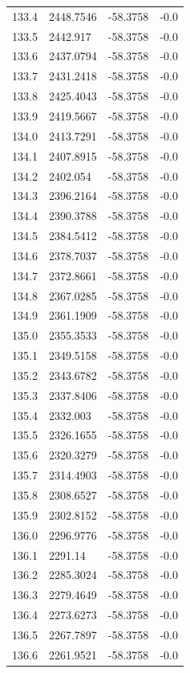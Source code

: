 \begin{table}[H]
\begin{tabular}{llll}
133.4 & 2448.7546 & -58.3758 & -0.0 \\
133.5 & 2442.917 & -58.3758 & -0.0 \\
133.6 & 2437.0794 & -58.3758 & -0.0 \\
133.7 & 2431.2418 & -58.3758 & -0.0 \\
133.8 & 2425.4043 & -58.3758 & -0.0 \\
133.9 & 2419.5667 & -58.3758 & -0.0 \\
134.0 & 2413.7291 & -58.3758 & -0.0 \\
134.1 & 2407.8915 & -58.3758 & -0.0 \\
134.2 & 2402.054 & -58.3758 & -0.0 \\
134.3 & 2396.2164 & -58.3758 & -0.0 \\
134.4 & 2390.3788 & -58.3758 & -0.0 \\
134.5 & 2384.5412 & -58.3758 & -0.0 \\
134.6 & 2378.7037 & -58.3758 & -0.0 \\
134.7 & 2372.8661 & -58.3758 & -0.0 \\
134.8 & 2367.0285 & -58.3758 & -0.0 \\
134.9 & 2361.1909 & -58.3758 & -0.0 \\
135.0 & 2355.3533 & -58.3758 & -0.0 \\
135.1 & 2349.5158 & -58.3758 & -0.0 \\
135.2 & 2343.6782 & -58.3758 & -0.0 \\
135.3 & 2337.8406 & -58.3758 & -0.0 \\
135.4 & 2332.003 & -58.3758 & -0.0 \\
135.5 & 2326.1655 & -58.3758 & -0.0 \\
135.6 & 2320.3279 & -58.3758 & -0.0 \\
135.7 & 2314.4903 & -58.3758 & -0.0 \\
135.8 & 2308.6527 & -58.3758 & -0.0 \\
135.9 & 2302.8152 & -58.3758 & -0.0 \\
136.0 & 2296.9776 & -58.3758 & -0.0 \\
136.1 & 2291.14 & -58.3758 & -0.0 \\
136.2 & 2285.3024 & -58.3758 & -0.0 \\
136.3 & 2279.4649 & -58.3758 & -0.0 \\
136.4 & 2273.6273 & -58.3758 & -0.0 \\
136.5 & 2267.7897 & -58.3758 & -0.0 \\
136.6 & 2261.9521 & -58.3758 & -0.0 \\

\end{tabular}
\end{table}
